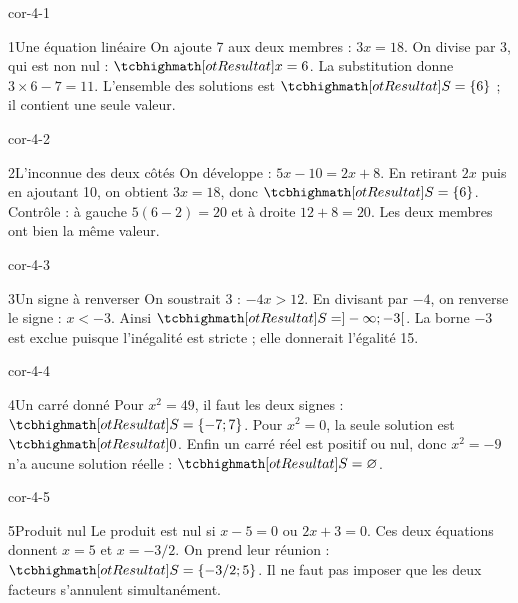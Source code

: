 \clearpage\pagestyle{otMain}\fontsize{11}{15}\selectfont
{}
\begin{blocLivre}{cor-4-1}
\begin{corrige}{1}{Une équation linéaire}
On ajoute 7 aux deux membres : $3x=18$. On divise par 3, qui est non nul : $\res{x=6}$. La substitution donne $3\times6-7=11$. L’ensemble des solutions est $\res{S=\{6\}}$ ; il contient une seule valeur.
\end{corrige}
\end{blocLivre}
\begin{blocLivre}{cor-4-2}
\begin{corrige}{2}{L’inconnue des deux côtés}
On développe : $5x-10=2x+8$. En retirant $2x$ puis en ajoutant 10, on obtient $3x=18$, donc $\res{S=\{6\}}$. Contrôle : à gauche $5(6-2)=20$ et à droite $12+8=20$. Les deux membres ont bien la même valeur.
\end{corrige}
\end{blocLivre}
\begin{blocLivre}{cor-4-3}
\begin{corrige}{3}{Un signe à renverser}
On soustrait 3 : $-4x>12$. En divisant par $-4$, on renverse le signe : $x<-3$. Ainsi $\res{S=]-\infty;-3[}$. La borne $-3$ est exclue puisque l’inégalité est stricte ; elle donnerait l’égalité 15.
\end{corrige}
\end{blocLivre}
\begin{blocLivre}{cor-4-4}
\begin{corrige}{4}{Un carré donné}
Pour $x^2=49$, il faut les deux signes : $\res{S=\{-7;7\}}$. Pour $x^2=0$, la seule solution est $\res0$. Enfin un carré réel est positif ou nul, donc $x^2=-9$ n’a aucune solution réelle : $\res{S=\varnothing}$.
\end{corrige}
\end{blocLivre}
\begin{blocLivre}{cor-4-5}
\begin{corrige}{5}{Produit nul}
Le produit est nul si $x-5=0$ ou $2x+3=0$. Ces deux équations donnent $x=5$ et $x=-3/2$. On prend leur réunion : $\res{S=\{-3/2;5\}}$. Il ne faut pas imposer que les deux facteurs s’annulent simultanément.
\end{corrige}
\end{blocLivre}
